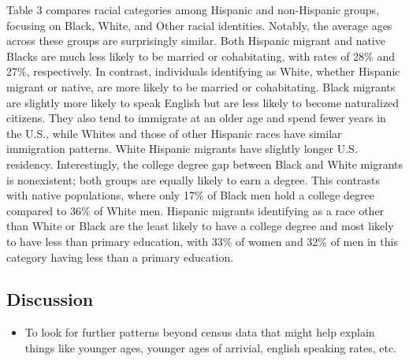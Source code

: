 \documentclass[
]{article}
\providecommand{\tightlist}{%
  \setlength{\itemsep}{0pt}\setlength{\parskip}{0pt}}\usepackage{longtable,booktabs,array}
\begin{document}
Table 3 compares racial categories among Hispanic and non-Hispanic
groups, focusing on Black, White, and Other racial identities. Notably,
the average ages across these groups are surprisingly similar. Both
Hispanic migrant and native Blacks are much less likely to be married or
cohabitating, with rates of 28\% and 27\%, respectively. In contrast,
individuals identifying as White, whether Hispanic migrant or native,
are more likely to be married or cohabitating. Black migrants are
slightly more likely to speak English but are less likely to become
naturalized citizens. They also tend to immigrate at an older age and
spend fewer years in the U.S., while Whites and those of other Hispanic
races have similar immigration patterns. White Hispanic migrants have
slightly longer U.S. residency. Interestingly, the college degree gap
between Black and White migrants is nonexistent; both groups are equally
likely to earn a degree. This contrasts with native populations, where
only 17\% of Black men hold a college degree compared to 36\% of White
men. Hispanic migrants identifying as a race other than White or Black
are the least likely to have a college degree and most likely to have
less than primary education, with 33\% of women and 32\% of men in this
category having less than a primary education.

\subsection{Discussion}\label{discussion}

\begin{itemize}
\tightlist
\item
  To look for further patterns beyond census data that might help
  explain things like younger ages, younger ages of arrivial, english
  speaking rates, etc.
\end{itemize}

\newpage
\end{document}

